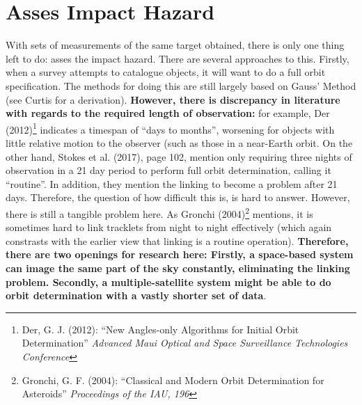 \documentclass[a4paper,10pt]{article}
\begin{document}
\section{Asses Impact Hazard}
With sets of measurements of the same target obtained, there is only one thing left to do: asses the impact hazard. There are several approaches to this. Firstly, when a survey attempts to catalogue objects, it will want to do a full orbit specification. The methods for doing this are still largely based on Gauss' Method (see Curtis for a derivation). \textbf{However, there is discrepancy in literature with regards to the required length of observation:} for example, Der (2012)\footnote{Der, G. J. (2012): ``New Angles-only Algorithms for Initial Orbit Determination'' \textit{Advanced Maui Optical and Space Surveillance Technologies Conference}} indicates a timespan of ``days to months'', worsening for objects with little relative motion to the observer (such as those in a near-Earth orbit. On the other hand, Stokes et al. (2017), page 102, mention only requiring three nights of observation in a 21 day period to perform full orbit determination, calling it ``routine''. In addition, they mention the linking to become a problem after 21 days. Therefore, the question of how difficult this is, is hard to answer. However, there is still a tangible problem here. As Gronchi (2004)\footnote{Gronchi, G. F. (2004): ``Classical and Modern Orbit Determination for Asteroids'' \textit{Proceedings of the IAU, 196}} mentions, it is sometimes hard to link tracklets from night to night effectively (which again constrasts with the earlier view that linking is a routine operation). \textbf{Therefore, there are two openings for research here: Firstly, a space-based system can image the same part of the sky constantly, eliminating the linking problem. Secondly, a multiple-satellite system might be able to do orbit determination with a vastly shorter set of data}.\newpage
\end{document}
